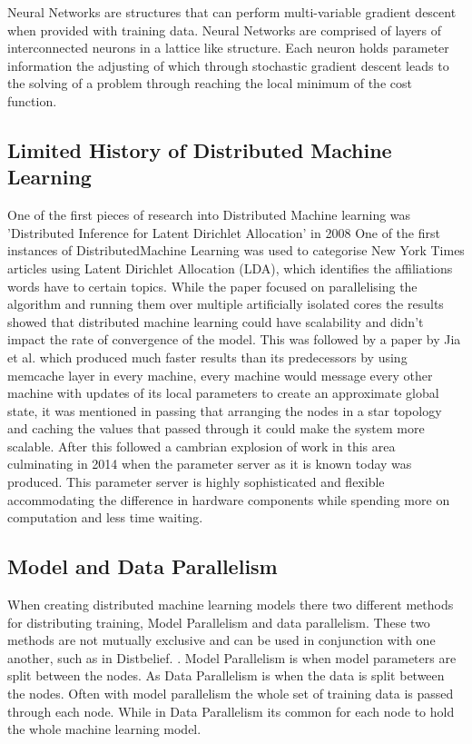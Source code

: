 Neural Networks are structures that can perform multi-variable gradient descent
when provided with training data. Neural Networks are comprised of layers of
interconnected neurons in a lattice like structure. Each neuron holds parameter
information the adjusting of which through stochastic gradient descent leads to
the solving of a problem through reaching the local minimum of the cost
function.

\subsection{Limited History of Distributed Machine Learning}
One of the first pieces of research into Distributed Machine learning was
’Distributed Inference for Latent Dirichlet Allocation’ in 2008
\cite{newman2008distributed} One of the first instances of DistributedMachine
Learning  was  used  to  categorise  New York  Times  articles  using  Latent
Dirichlet Allocation (LDA), which identifies the affiliations words have to
certain topics.  While the paper focused on parallelising the algorithm and
running them over multiple artificially isolated cores the results showed that
distributed machine learning could have scalability and didn’t impact the rate
of convergence of the model.  This was followed by a paper by Jia et al.
\cite{ParallelTopicModels} which produced much faster results than its
predecessors by using memcache layer in every machine, every machine would
message every other machine with updates of its local parameters to create an
approximate global state, it was mentioned in passing that arranging the nodes
in a star topology and caching the values that passed through it could make the
system more scalable. After this followed a cambrian explosion of work in this
area \cite{Ahmed2012YahooLDA, li2014communication, Dean2012Distbelief,
googlemapreduce2008} culminating in 2014 when the parameter server as it is
known today \cite{LI2014ParameterServers} was produced. This parameter server is
highly sophisticated and flexible accommodating the difference in hardware
components while spending more on computation and less time waiting.

\subsection{Model and Data Parallelism}
When creating distributed machine learning models there two different methods
for distributing training, Model Parallelism and data parallelism. These two
methods are not mutually exclusive and can be used in conjunction with one
another, such as in Distbelief. \cite{Dean2012Distbelief}. Model Parallelism is
when model parameters are split between the nodes. As Data Parallelism is when
the data is split between the nodes. \cite{Xing2015Petuum} Often with model
parallelism the whole set of training data is passed through each node. While in
Data Parallelism its common for each node to hold the whole machine learning
model.

